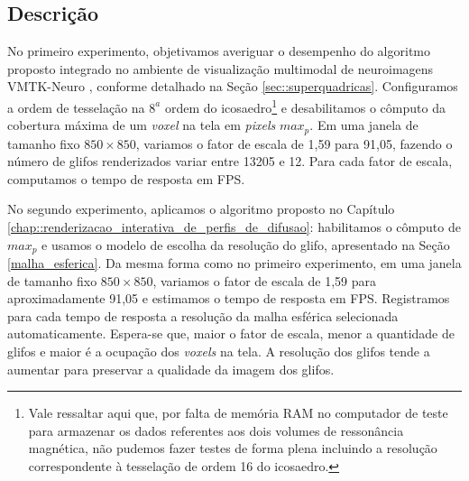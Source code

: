 \subsection{Descrição}




No primeiro experimento, objetivamos averiguar o desempenho do algoritmo proposto integrado no ambiente de visualização multimodal de neuroimagens VMTK-Neuro \cite{VMTKNeuro}, conforme detalhado na Seção \ref{sec::superquadricas}. Configuramos a ordem de tesselação na $8^a$ ordem do icosaedro\footnote{Vale ressaltar aqui que, por falta de memória RAM no computador de teste para armazenar os dados referentes aos dois volumes de ressonância magnética, não pudemos fazer testes de forma plena incluindo a resolução correspondente à tesselação de ordem 16 do icosaedro.} e desabilitamos o cômputo da cobertura máxima de um \textit{voxel} na tela em \textit{pixels} $max_p$. Em uma janela de tamanho fixo $850 \times 850$, variamos o fator de escala de 1,59 para 91,05, fazendo o número de glifos renderizados variar entre 13205 e 12. Para cada fator de escala, computamos o tempo de resposta em FPS.

No segundo experimento, aplicamos o algoritmo proposto no Capítulo \ref{chap::renderizacao_interativa_de_perfis_de_difusao}: habilitamos o cômputo de $max_p$ e usamos o modelo de escolha da resolução do glifo, apresentado na Seção \ref{malha_esferica}. Da mesma forma como no primeiro experimento, em uma janela de tamanho fixo $850 \times 850$, variamos o fator de escala de 1,59 para aproximadamente 91,05 e estimamos o tempo de resposta em FPS. Registramos para cada tempo de resposta a resolução da malha esférica selecionada automaticamente. Espera-se que, maior o fator de escala, menor a quantidade de glifos e maior é a ocupação dos \textit{voxels} na tela. A resolução dos glifos tende a aumentar para preservar a qualidade da imagem dos glifos.

